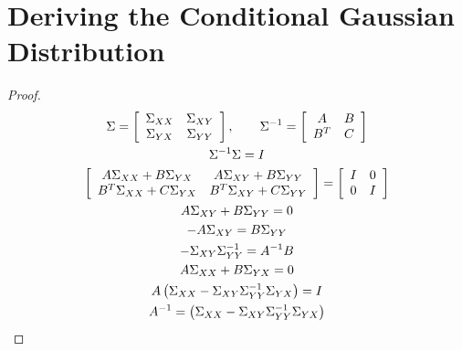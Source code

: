 \documentclass{article}
\begin{document}
\section{Deriving the Conditional Gaussian Distribution}
    \begin{proof}
        \begin{gather*}
            \Sigma = \left[\begin{array}{c c} \Sigma_{XX} & \Sigma_{XY} \\
               \Sigma_{YX} & \Sigma_{YY}\end{array}\right], \quad\quad
                \Sigma^{-1} = \left[\begin{array}{c c} A & B \\
                B^T & C\end{array}\right]
                \\
                \Sigma^{-1}\Sigma = I
                \\
                \left[\begin{array}{c c}
                A\Sigma_{XX} + B\Sigma_{YX} & A\Sigma_{XY} + B\Sigma_{YY}\\
                B^T\Sigma_{XX} + C\Sigma_{YX} & B^T\Sigma_{XY} + C\Sigma_{YY}
                \end{array}\right] = \left[\begin{array}{c c} I & 0 \\ 0 &
                I\end{array}\right]
                \\
                A\Sigma_{XY} + B\Sigma_{YY} = 0
                \\
                -A\Sigma_{XY} =  B\Sigma_{YY}
                \\
                -\Sigma_{XY}\Sigma_{YY}^{-1} = A^{-1}B
                \\
                A\Sigma_{XX} + B\Sigma_{YX} = 0 
                \\
                A\left(\Sigma_{XX} -
                \Sigma_{XY}\Sigma_{YY}^{-1}\Sigma_{YX}\right) = I
                \\
                A^{-1} = \left(\Sigma_{XX} -
                \Sigma_{XY}\Sigma_{YY}^{-1}\Sigma_{YX}\right)
        \end{gather*}
    \end{proof}
\end{document}
